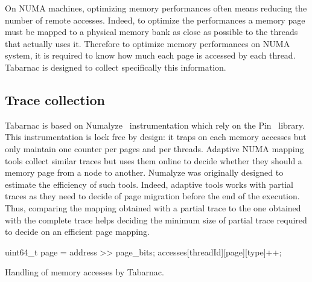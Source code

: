 On \gls{NUMA} machines, optimizing memory performances often means reducing the number of remote accesses.
Indeed, to optimize the performances a memory page must be mapped to a physical memory bank as close as possible to the threads that actually uses it.
Therefore to optimize memory performances on \gls{NUMA} system, it is required to know how much each page is accessed by each thread.
\gls{Tabarnac} is designed to collect specifically this information.

\subsection{Trace collection}

\gls{Tabarnac} is based on \gls{Numalyze}~\cite{Diener15Characterizing} instrumentation which rely on the \gls{Pin}~\cite{Luk05Pin} library.
This instrumentation is lock free by design: it traps on each memory accesses but only maintain one counter per pages and per threads.
Adaptive \gls{NUMA} mapping tools collect similar traces but uses them online to decide whether they should a memory page from a node to another.
\gls{Numalyze} was originally designed to estimate the efficiency of such tools.
Indeed, adaptive tools works with partial traces as they need to decide of page migration before the end of the execution.
Thus, comparing the mapping obtained with a partial trace to the one obtained with the complete trace helps deciding the minimum size of partial trace required to decide on an efficient page mapping.

\begin{algorithm}[htb]
    \begin{algorithmic}
            \State uint64\_t page = address >> page\_bits;
            \State accesses[threadId][page][type]++;
        \EndFunction
    \end{algorithmic}
    \caption{Handling of memory accesses by Tabarnac.}
    \label{alg:Tabarnac}
\end{algorithm}


